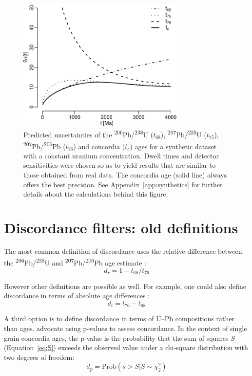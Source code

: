 \documentclass[gchron, manuscript]{copernicus}
\begin{document}
\begin{figure}[t]
  \includegraphics[width=8.3cm]{agerr.pdf}
  \caption{Predicted uncertainties of the
    \textsuperscript{206}Pb/\textsuperscript{238}U ($t_{68}$),
    \textsuperscript{207}Pb/\textsuperscript{235}U ($t_{75}$),
    \textsuperscript{207}Pb/\textsuperscript{206}Pb ($t_{76}$) and
    concordia ($t_c$) ages for a synthetic dataset with a constant
    uranium concentration. Dwell times and detector sensitivities were
    chosen so as to yield results that are similar to those obtained
    from real data. The concordia age (solid line) always offers the
    best precision. See Appendix~\ref{app:synthetics} for further
    details about the calculations behind this figure.}
  \label{fig:precision}
\end{figure}

\section{Discordance filters: old definitions}\label{sec:discordance1}

The most common definition of discordance uses the relative difference
between the \textsuperscript{206}Pb/\textsuperscript{238}U and
\textsuperscript{207}Pb/\textsuperscript{206}Pb age estimate 
\citep{gehrels2011}:
\begin{equation}
  d_r = 1 - t_{68}/t_{76}
  \label{eq:dr}
\end{equation}

However other definitions are possible as well. For example, one could
also define discordance in terms of absolute age differences
\citep{puetz2018}:
\begin{equation}
  d_t = t_{76} - t_{68}
  \label{eq:dt}
\end{equation}

A third option is to define discordance in terms of U--Pb compositions
rather than ages. \citet{spencer2016} advocate using p-values to
assess concordance. In the context of single grain concordia ages, the
p-value is the probability that the sum of squares $S$
(Equation~\ref{eq:S}) exceeds the observed value under a chi-square
distribution with two degrees of freedom:
\begin{equation}
  d_p = \mbox{Prob}\left(s > S | S \sim \chi^2_2
    \right)
  \label{eq:dp}
\end{equation}
\end{document}

